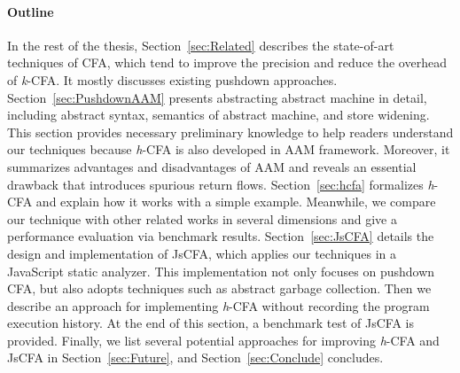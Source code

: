 \documentclass[12pt]{report}
\begin{document}
\paragraph{Outline}
In the rest of the thesis,
Section~\ref{sec:Related} describes the state-of-art techniques of CFA, which tend to improve the precision and reduce the overhead of \textit{k}-CFA\@. It mostly discusses existing pushdown approaches.
Section~\ref{sec:PushdownAAM} presents abstracting abstract machine in detail, including abstract syntax, semantics of abstract machine,
and store widening.
This section provides necessary preliminary knowledge to help readers understand our techniques because \textit{h}-CFA is also developed in AAM framework.
Moreover, it summarizes advantages and disadvantages of AAM and reveals an essential drawback that introduces spurious return flows.
Section~\ref{sec:hcfa} formalizes \textit{h}-CFA and explain how it works with a simple example.
Meanwhile, we compare our technique with other related works in several dimensions and give a performance evaluation via benchmark results.
Section~\ref{sec:JsCFA} details the design and implementation of JsCFA, which applies our techniques in a JavaScript static analyzer.
This implementation not only focuses on pushdown CFA, but also adopts techniques
such as abstract garbage collection.
Then we describe an approach for implementing \textit{h}-CFA without recording the program execution history.
At the end of this section, a benchmark test of JsCFA is provided.
Finally, we list several potential approaches for improving \textit{h}-CFA and JsCFA in Section~\ref{sec:Future}, and Section~\ref{sec:Conclude} concludes.
\end{document}

